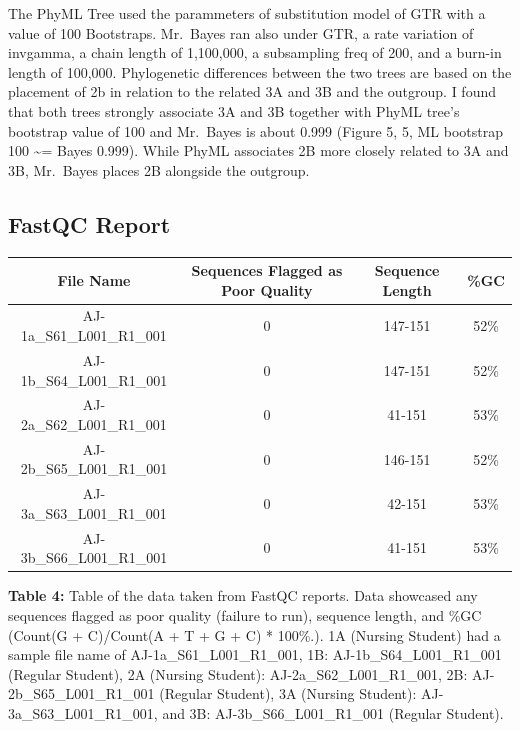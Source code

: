 \documentclass[]{article}
\begin{document}
The PhyML Tree used the parammeters of substitution model of GTR with a
value of 100 Bootstraps. Mr.~Bayes ran also under GTR, a rate variation
of invgamma, a chain length of 1,100,000, a subsampling freq of 200, and
a burn-in length of 100,000. Phylogenetic differences between the two
trees are based on the placement of 2b in relation to the related 3A and
3B and the outgroup. I found that both trees strongly associate 3A and
3B together with PhyML tree's bootstrap value of 100 and Mr.~Bayes is
about 0.999 (Figure 5, 5, ML bootstrap 100 \textasciitilde{}= Bayes
0.999). While PhyML associates 2B more closely related to 3A and 3B,
Mr.~Bayes places 2B alongside the outgroup.

\hypertarget{fastqc-report}{%
\subsection{FastQC Report}\label{fastqc-report}}

\begin{longtable}[]{@{}cccc@{}}
\toprule
File Name & Sequences Flagged as Poor Quality & Sequence Length &
\%GC\tabularnewline
\midrule
\endhead
AJ-1a\_S61\_L001\_R1\_001 & 0 & 147-151 & 52\%\tabularnewline
AJ-1b\_S64\_L001\_R1\_001 & 0 & 147-151 & 52\%\tabularnewline
AJ-2a\_S62\_L001\_R1\_001 & 0 & 41-151 & 53\%\tabularnewline
AJ-2b\_S65\_L001\_R1\_001 & 0 & 146-151 & 52\%\tabularnewline
AJ-3a\_S63\_L001\_R1\_001 & 0 & 42-151 & 53\%\tabularnewline
AJ-3b\_S66\_L001\_R1\_001 & 0 & 41-151 & 53\%\tabularnewline
\bottomrule
\end{longtable}

\textbf{Table 4:} Table of the data taken from FastQC reports. Data
showcased any sequences flagged as poor quality (failure to run),
sequence length, and \%GC (Count(G + C)/Count(A + T + G + C) * 100\%.).
1A (Nursing Student) had a sample file name of
AJ-1a\_S61\_L001\_R1\_001, 1B: AJ-1b\_S64\_L001\_R1\_001 (Regular
Student), 2A (Nursing Student): AJ-2a\_S62\_L001\_R1\_001, 2B:
AJ-2b\_S65\_L001\_R1\_001 (Regular Student), 3A (Nursing Student):
AJ-3a\_S63\_L001\_R1\_001, and 3B: AJ-3b\_S66\_L001\_R1\_001 (Regular
Student).
\end{document}
